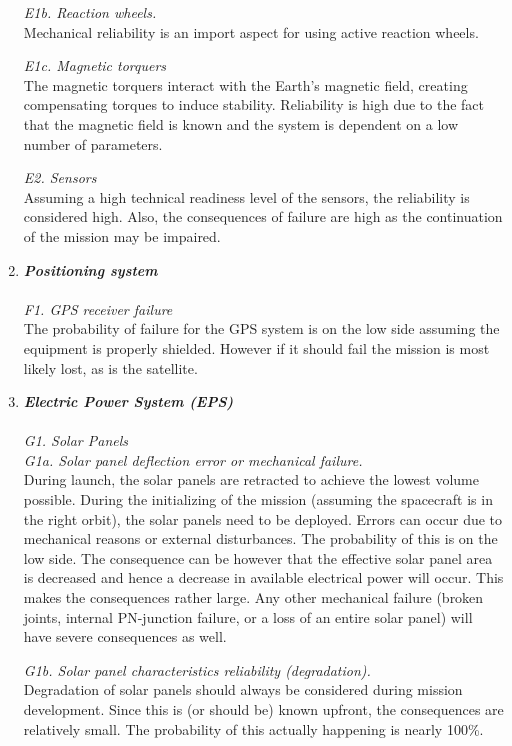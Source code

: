 \begin{enumerate}[A]
\textit{E1b. Reaction wheels.}\\ 
Mechanical reliability is an import aspect for using active reaction wheels. 

\textit{E1c. Magnetic torquers}\\ 
The magnetic torquers interact with the Earth's magnetic field, creating compensating torques to induce stability. Reliability is high due to the fact that the magnetic field is known and the system is dependent on a low number of parameters.

\textit{E2. Sensors}\\ 
Assuming a high technical readiness level of the sensors, the reliability is considered high. Also, the consequences of failure are high as the continuation of the mission may be impaired.

	\item  \textbf{\textit{Positioning system}} \\\\
\textit{F1. GPS receiver failure}\\
The probability of failure for the GPS system is on the low side assuming the equipment is properly shielded. However if it should fail the mission is most likely lost, as is the satellite.

	\item  \textbf{\textit{Electric Power System (EPS)}} \\\\
\textit{G1. Solar Panels}\\

\textit{G1a. Solar panel deflection error or mechanical failure.}\\ 
During launch, the solar panels are retracted to achieve the lowest volume possible. During the initializing of the mission (assuming the spacecraft is in the right orbit), the solar panels need to be deployed. Errors can occur due to mechanical reasons or external disturbances. The probability of this is on the low side. The consequence can be however that the effective solar panel area is decreased and hence a decrease in available electrical power will occur. This makes the consequences rather large. Any other mechanical failure (broken joints, internal PN-junction failure, or a loss of an entire solar panel) will have severe consequences as well. 

\textit{G1b. Solar panel characteristics reliability (degradation).}\\ Degradation of solar panels should always be considered during mission development. Since this is (or should be) known upfront, the consequences are relatively small. The probability of this actually happening is nearly 100\%.


\end{enumerate}
